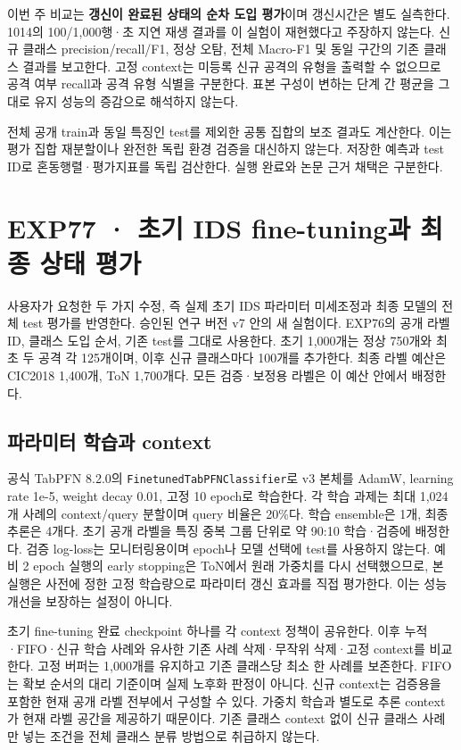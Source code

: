 이번 주 비교는 \textbf{갱신이 완료된 상태의 순차 도입 평가}이며 갱신시간은 별도 실측한다. 1014의 100/\allowbreak{}1,000행·초 지연 재생 결과를 이 실험이 재현했다고 주장하지 않는다. 신규 클래스 precision/\allowbreak{}recall/\allowbreak{}F1, 정상 오탐, 전체 Macro-F1 및 동일 구간의 기존 클래스 결과를 보고한다. 고정 context는 미등록 신규 공격의 유형을 출력할 수 없으므로 공격 여부 recall과 공격 유형 식별을 구분한다. 표본 구성이 변하는 단계 간 평균을 그대로 유지 성능의 증감으로 해석하지 않는다.

전체 공개 train과 동일 특징인 test를 제외한 공통 집합의 보조 결과도 계산한다. 이는 평가 집합 재분할이나 완전한 독립 환경 검증을 대신하지 않는다. 저장한 예측과 test ID로 혼동행렬·평가지표를 독립 검산한다. 실행 완료와 논문 근거 채택은 구분한다.



\section{EXP77 · 초기 IDS fine-tuning과 최종 상태 평가}
사용자가 요청한 두 가지 수정, 즉 실제 초기 IDS 파라미터 미세조정과 최종 모델의 전체 test 평가를 반영한다. 승인된 연구 버전 v7 안의 새 실험이다. EXP76의 공개 라벨 ID, 클래스 도입 순서, 기존 test를 그대로 사용한다. 초기 1,000개는 정상 750개와 최초 두 공격 각 125개이며, 이후 신규 클래스마다 100개를 추가한다. 최종 라벨 예산은 CIC2018 1,400개, ToN 1,700개다. 모든 검증·보정용 라벨은 이 예산 안에서 배정한다.

\subsection{파라미터 학습과 context}
공식 TabPFN 8.2.0의 \texttt{Finetune\allowbreak{}dTabPFNC\allowbreak{}lassifie\allowbreak{}r}로 v3 본체를 AdamW, learning rate 1e-5, weight decay 0.01, 고정 10 epoch로 학습한다. 각 학습 과제는 최대 1,024개 사례의 context/\allowbreak{}query 분할이며 query 비율은 20\%다. 학습 ensemble은 1개, 최종 추론은 4개다. 초기 공개 라벨을 특징 중복 그룹 단위로 약 90:10 학습·검증에 배정한다. 검증 log-loss는 모니터링용이며 epoch나 모델 선택에 test를 사용하지 않는다. 예비 2 epoch 실행의 early stopping은 ToN에서 원래 가중치를 다시 선택했으므로, 본 실행은 사전에 정한 고정 학습량으로 파라미터 갱신 효과를 직접 평가한다. 이는 성능 개선을 보장하는 설정이 아니다.

초기 fine-tuning 완료 checkpoint 하나를 각 context 정책이 공유한다. 이후 누적·FIFO·신규 학습 사례와 유사한 기존 사례 삭제·무작위 삭제·고정 context를 비교한다. 고정 버퍼는 1,000개를 유지하고 기존 클래스당 최소 한 사례를 보존한다. FIFO는 확보 순서의 대리 기준이며 실제 노후화 판정이 아니다. 신규 context는 검증용을 포함한 현재 공개 라벨 전부에서 구성할 수 있다. 가중치 학습과 별도로 추론 context가 현재 라벨 공간을 제공하기 때문이다. 기존 클래스 context 없이 신규 클래스 사례만 넣는 조건을 전체 클래스 분류 방법으로 취급하지 않는다.

